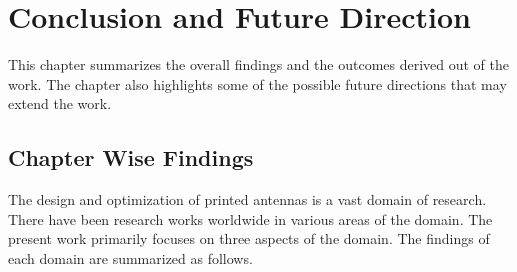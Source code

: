 \chapter{Conclusion and Future Direction}
\label{chap:chap6}
This chapter summarizes the overall findings and the outcomes derived out of the work. The chapter also highlights some of the possible future directions that may extend the work.

\section{Chapter Wise Findings}
The design and optimization of printed antennas is a vast domain of research. There have been research works worldwide in various areas of the domain. The present work primarily focuses on three  aspects of the domain. The findings of each domain are summarized as follows.

